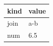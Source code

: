 \documentclass[11pt,a4paper]{article}
\begin{document}
\begin{table}[h]
\begin{tabular}{|l|l|}
\hline
kind & value \\ \hline
join & a-b \\ \hline
num & 6.5 \\ \hline
\end{tabular}
\end{table}
\end{document}
